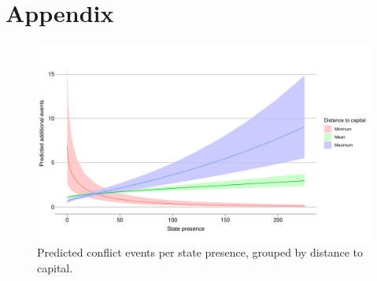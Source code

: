 \documentclass[12pt]{article}
\begin{document}

\pagebreak




\pagebreak
\section*{Appendix}









\begin{figure}[htpb]
	\centering
	\includegraphics[width=\linewidth]{"../R/Output/SBzinbplot.pdf"}
	\caption{Predicted conflict events per state presence, grouped by
	distance to capital.}
	\label{state_int}
\end{figure}
\end{document}
